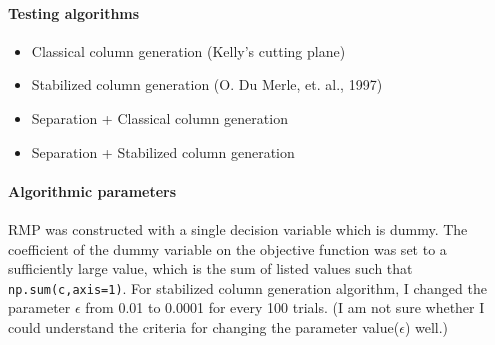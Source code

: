 \documentclass[12pt]{article}
\begin{document}
\paragraph{Testing algorithms}
\begin{itemize}
	\item Classical column generation (Kelly's cutting plane)
	\item Stabilized column generation (O. Du Merle, et. al., 1997)
	\item Separation + Classical column generation
	\item Separation + Stabilized column generation
\end{itemize}


\paragraph{Algorithmic parameters}

RMP was constructed with a single decision variable which is dummy. The coefficient of the dummy variable on the objective function was set to a sufficiently large value, which is the sum of listed values such that \verb|np.sum(c,axis=1)|. For stabilized column generation algorithm, I changed the parameter $\epsilon$ from 0.01 to 0.0001 for every 100 trials. (I am not sure whether I could understand the criteria for changing the parameter value($\epsilon$) well.)
\end{document}
